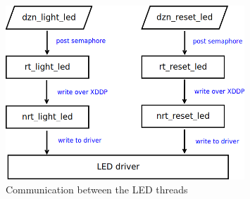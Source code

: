 \documentclass[12pt]{scrreprt}
\begin{document}
\begin{figure}[H]
    \centering
    \includegraphics[width=0.8\textwidth]{Figures/results/modelling_figures/Threading/LED_threads.png}
    \caption{Communication between the LED threads}
    \label{fig:led_threads}
\end{figure}
\end{document}
